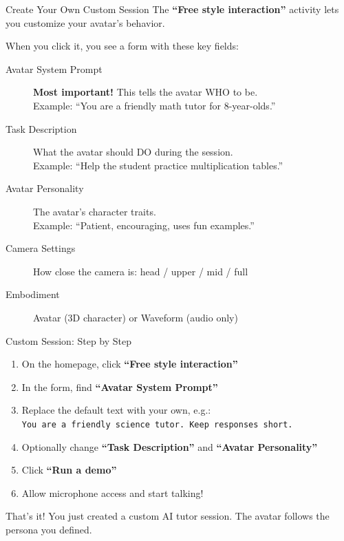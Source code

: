 \documentclass[aspectratio=169]{beamer}
\begin{document}
\begin{frame}{Create Your Own Custom Session}
The \textbf{``Free style interaction''} activity lets you customize your avatar's behavior.

\vspace{0.2cm}

When you click it, you see a form with these key fields:

\vspace{0.2cm}

\begin{description}
    \item[\textcolor{kivablue}{Avatar System Prompt}] \textbf{Most important!} This tells the avatar WHO to be.\\
          {\small Example: ``You are a friendly math tutor for 8-year-olds.''}
    \item[\textcolor{kivablue}{Task Description}] What the avatar should DO during the session.\\
          {\small Example: ``Help the student practice multiplication tables.''}
    \item[\textcolor{kivablue}{Avatar Personality}] The avatar's character traits.\\
          {\small Example: ``Patient, encouraging, uses fun examples.''}
    \item[\textcolor{kivablue}{Camera Settings}] How close the camera is: head / upper / mid / full
    \item[\textcolor{kivablue}{Embodiment}] Avatar (3D character) or Waveform (audio only)
\end{description}
\end{frame}

\begin{frame}{Custom Session: Step by Step}
\begin{enumerate}
    \setlength\itemsep{0.25cm}
    \item On the homepage, click \textbf{``Free style interaction''}
    \item In the form, find \textbf{``Avatar System Prompt''}
    \item Replace the default text with your own, e.g.:\\
          {\small \texttt{You are a friendly science tutor. Keep responses short.}}
    \item Optionally change \textbf{``Task Description''} and \textbf{``Avatar Personality''}
    \item Click \textbf{``Run a demo''}
    \item Allow microphone access and start talking!
\end{enumerate}

\vspace{0.2cm}

\begin{block}{That's it!}
You just created a custom AI tutor session. The avatar follows the persona you defined.
\end{block}
\end{frame}
\end{document}
